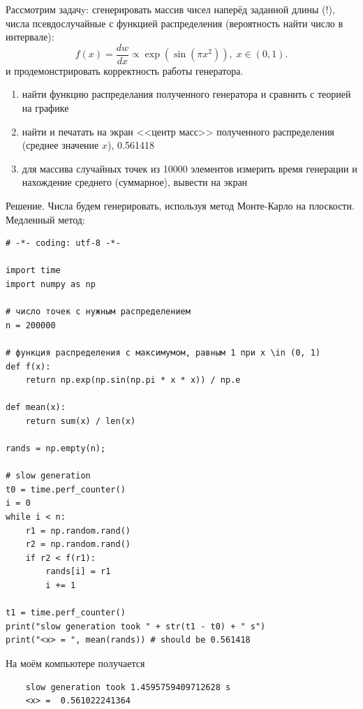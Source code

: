 \documentclass{book}
\begin{document}
Рассмотрим
задачy: сгенерировать массив чисел наперёд заданной длины (!), числа псевдослучайные
с функцией распределения (вероятность найти число в интервале):
\begin{equation}
    f(x) = \frac{dw}{dx} \propto \exp(\sin(\pi x^2)),\; x \in (0, 1).
\end{equation}
и продемонстрировать корректность работы генератора.
\begin{enumerate}
  \item найти функцию распределания полученного генератора и сравнить с теорией
      на графике %
  \item найти и печатать на экран <<центр масс>> полученного
      распределения (среднее значение $x$), 0.561418%
  \item для массива случайных точек из 10000 элементов измерить время генерации
      и нахождение среднего (суммарное), вывести на экран %
\end{enumerate}

Решение. Числа будем генерировать, используя метод Монте-Карло на плоскости. Медленный метод:
\begin{verbatim}
# -*- coding: utf-8 -*-

import time
import numpy as np

# число точек с нужным распределением
n = 200000

# функция распределения с максимумом, равным 1 при x \in (0, 1)
def f(x):
    return np.exp(np.sin(np.pi * x * x)) / np.e

def mean(x):
    return sum(x) / len(x)

rands = np.empty(n);

# slow generation
t0 = time.perf_counter()
i = 0
while i < n:
    r1 = np.random.rand()
    r2 = np.random.rand()
    if r2 < f(r1):
        rands[i] = r1
        i += 1

t1 = time.perf_counter()
print("slow generation took " + str(t1 - t0) + " s")
print("<x> = ", mean(rands)) # should be 0.561418
\end{verbatim}
На моём компьютере получается
\begin{verbatim}
    slow generation took 1.4595759409712628 s
    <x> =  0.561022241364
\end{verbatim}
\end{document}
